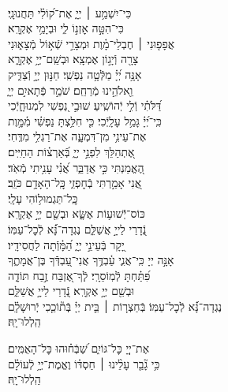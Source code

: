 \documentclass[twoside, openany, parskip=half, 11pt]{book}
\begin{document}
{\begin{narrow}
\\
כִּי־יִשְׁמַ֥ע ׀ יְיָ֑ \hfill אֶת־ק֝וֹלִ֗י תַּחֲנוּנָֽי׃ \\
כִּי־הִטָּ֣ה אׇזְנ֣וֹ לִ֑י \hfill וּבְיָמַ֥י אֶקְרָֽא׃ \\
אֲפָפ֤וּנִי ׀ חֶבְלֵי־מָ֗וֶת \hfill וּמְצָרֵ֣י שְֿׁא֣וֹל מְֿצָא֑וּנִי\\ צָרָ֖ה וְֿיָג֣וֹן אֶמְצָֽא׃ \hfill
וּבְשֵֽׁם־יְיָ֥ אֶקְרָ֑א\\ אָנָּ֥ה יְ֝יָ֗ מַלְּֿטָ֥ה נַפְשִֽׁי׃ \hfill
חַנּ֣וּן יְיָ֣ וְֿצַדִּ֑יק\\ וֵ֖אלֹהֵ֣ינוּ מְֿרַחֵֽם׃ \hfill
שֹׁמֵ֣ר פְּֿתָאיִ֣ם יְיָ֑\\ דַּ֝לֹּתִ֗י וְֿלִ֣י יְֿהוֹשִֽׁיעַ׃ \hfill
שׁוּבִ֣י נַ֭פְשִׁי לִמְנוּחָ֑יְֿכִי\\ כִּֽי־יְ֝יָ֗ גָּמַ֥ל עָלָֽיְֿכִי׃ \hfill
כִּ֤י חִלַּ֥צְתָּ נַפְשִׁ֗י מִ֫מָּ֥וֶת\\ אֶת־עֵינִ֥י מִן־דִּמְעָ֑ה \hfill אֶת־רַגְלִ֥י מִדֶּֽחִי׃ \\
אֶ֭תְהַלֵּךְ לִפְנֵ֣י יְיָ֑ \hfill בְּֿ֝אַרְצ֗וֹת הַחַיִּֽים׃ \\
הֶ֭אֱמַנְתִּי כִּ֣י אֲדַבֵּ֑ר \hfill אֲ֝נִ֗י עָנִ֥יתִי מְֿאֹֽד׃ \\
אֲ֭נִי אָמַ֣רְתִּי בְֿחׇפְזִ֑י \hfill כׇּֽל־הָאָדָ֥ם כֹּזֵֽב׃ \\

 \hfill
כׇּֽל־תַּגְמוּל֥וֹהִי עָלָֽי׃ \\
כּוֹס־יְֿֿשׁוּע֥וֹת אֶשָּׂ֑א \hfill וּבְשֵׁ֖ם יְיָ֣ אֶקְרָֽא׃ \\
נְֿ֭דָרַי לַייָ֣ אֲשַׁלֵּ֑ם \hfill נֶגְדָה־נָּ֗֝א לְֿכׇל־עַמּֽוֹ׃ \\
יָ֭קָר בְּֿעֵינֵ֣י יְיָ֑ \hfill הַ֝מָּ֗וְֿתָה לַחֲסִידָֽיו׃ \\
אָנָּ֣ה יְיָ כִּֽי־אֲנִ֢י עַ֫בְדֶּ֥ךָ \hfill אֲנִי־עַ֭בְדְּֿֿךָ בֶּן־אֲמָתֶ֑ךָ\\ פִּ֝תַּ֗חְתָּ לְֿמֽוֹסֵרָֽי׃ \hfill
לְֽֿךָ־אֶ֭זְבַּח זֶ֣בַח תּוֹדָ֑ה\\ וּבְשֵׁ֖ם יְיָ֣ אֶקְרָֽא׃ \hfill
נְֿ֭דָרַי לַייָ֣ אֲשַׁלֵּ֑ם \\ נֶגְדָה־נָּ֗֝א לְֿכׇל־עַמּֽוֹ׃ \hfill
בְּֿחַצְר֤וֹת ׀ בֵּ֤ית יְיָ֗ בְּֽֿת֘וֹכֵ֤כִי יְֽֿרוּשָׁלָ֗‍ִם\\
הַֽלְלוּ־יָֽהּ׃ \hfill \break



אֶת־יְיָ֭ כׇּל־גּוֹיִ֑ם \hfill שַׁ֝בְּֿח֗וּהוּ כׇּל־הָאֻמִּֽים׃ \\
כִּ֥י גָ֘בַ֤ר עָלֵ֨ינוּ ׀ חַסְדּ֗וֹ \hfill וֶאֱמֶת־יְיָ֥ לְֿעוֹלָ֗ם\\
הַֽלְלוּ־יָֽהּ׃ \hfill \break


\end{narrow}}
\end{document}
